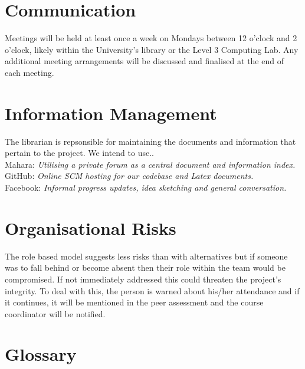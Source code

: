 \documentclass{l3deliverable}
\begin{document}
\section{Communication}

Meetings will be held at least once a week on Mondays between 12 o'clock and 2 o'clock, likely within the University’s library or the Level 3 Computing
Lab. Any additional meeting arrangements will be discussed and finalised at the end of each meeting.



\section{Information Management}

The librarian is repsonsible for maintaining the documents and information that pertain to the project.
We intend to use..\\

Mahara: \textit{Utilising a private forum as a central document and information index.}\\
GitHub: \textit{Online SCM hosting for our codebase and Latex documents.}\\
Facebook: \textit{Informal progress updates, idea sketching and general conversation.}\\



\section{Organisational Risks}

The role based model suggests less risks than with alternatives but if someone was to fall behind or
become absent then their role within the team would be compromised. If not immediately addressed
this could threaten the project’s integrity. To deal with this, the person is warned about his/her attendance and if it continues, it will be mentioned in the peer assessment and the course coordinator will be notified.


\appendix

\section{Glossary}
\end{document}
